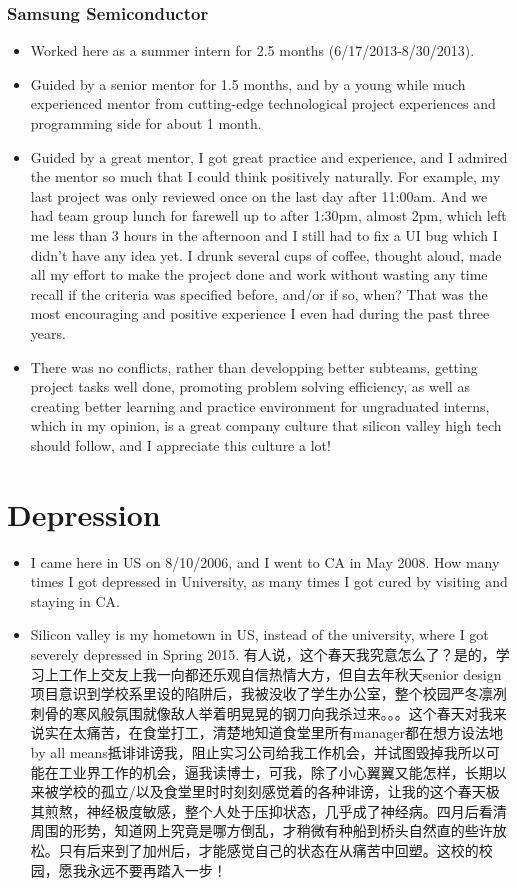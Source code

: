 \documentclass[9pt,b5paper]{article}
\begin{document}
\subsubsection{Samsung Semiconductor}
\label{sec-4-2-2}
\begin{itemize}
\item Worked here as a summer intern for 2.5 months (6/17/2013-8/30/2013).
\item Guided by a senior mentor for 1.5 months, and by a young while much experienced mentor from cutting-edge technological project experiences and programming side for about 1 month.
\item Guided by a great mentor, I got great practice and experience, and I admired the mentor so much that I could think positively naturally. For example, my last project was only reviewed once on the last day after 11:00am. And we had team group lunch for farewell up to after 1:30pm, almost 2pm, which left me less than 3 hours in the afternoon and I still had to fix a UI bug which I didn't have any idea yet. I drunk several cups of coffee, thought aloud, made all my effort to make the project done and work without wasting any time recall if the criteria was specified before, and/or if so, when? That was the most encouraging and positive experience I even had during the past three years.
\item There was no conflicts, rather than developping better subteams, getting project tasks well done, promoting problem solving efficiency, as well as creating better learning and practice environment for ungraduated interns, which in my opinion, is a great company culture that silicon valley high tech should follow, and I appreciate this culture a lot!
\end{itemize}

\section{Depression}
\label{sec-5}
\begin{itemize}
\item I came here in US on 8/10/2006, and I went to CA in May 2008. How many times I got depressed in University, as many times I got cured by visiting and staying in CA.
\item Silicon valley is my hometown in US, instead of the university, where I got severely depressed in Spring 2015. 有人说，这个春天我究意怎么了？是的，学习上工作上交友上我一向都还乐观自信热情大方，但自去年秋天senior design项目意识到学校系里设的陷阱后，我被没收了学生办公室，整个校园严冬凛冽刺骨的寒风般氛围就像敌人举着明晃晃的钢刀向我杀过来。。。这个春天对我来说实在太痛苦，在食堂打工，清楚地知道食堂里所有manager都在想方设法地by all means抵诽诽谤我，阻止实习公司给我工作机会，并试图毁掉我所以可能在工业界工作的机会，逼我读博士，可我，除了小心翼翼又能怎样，长期以来被学校的孤立/以及食堂里时时刻刻感觉着的各种诽谤，让我的这个春天极其煎熬，神经极度敏感，整个人处于压抑状态，几乎成了神经病。四月后看清周围的形势，知道网上究竟是哪方倒乱，才稍微有种船到桥头自然直的些许放松。只有后来到了加州后，才能感觉自己的状态在从痛苦中回塑。这校的校园，愿我永远不要再踏入一步！
\end{itemize}
\end{document}
